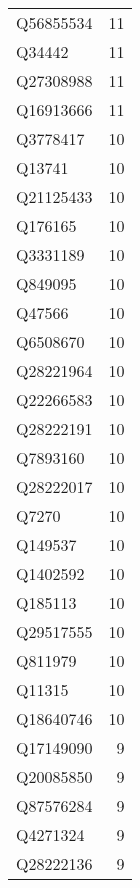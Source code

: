 \begin{tabular}{lr}
   Q56855534 &                            11 \\
      Q34442 &                            11 \\
   Q27308988 &                            11 \\
   Q16913666 &                            11 \\
    Q3778417 &                            10 \\
      Q13741 &                            10 \\
   Q21125433 &                            10 \\
     Q176165 &                            10 \\
    Q3331189 &                            10 \\
     Q849095 &                            10 \\
      Q47566 &                            10 \\
    Q6508670 &                            10 \\
   Q28221964 &                            10 \\
   Q22266583 &                            10 \\
   Q28222191 &                            10 \\
    Q7893160 &                            10 \\
   Q28222017 &                            10 \\
       Q7270 &                            10 \\
     Q149537 &                            10 \\
    Q1402592 &                            10 \\
     Q185113 &                            10 \\
   Q29517555 &                            10 \\
     Q811979 &                            10 \\
      Q11315 &                            10 \\
   Q18640746 &                            10 \\
   Q17149090 &                             9 \\
   Q20085850 &                             9 \\
   Q87576284 &                             9 \\
    Q4271324 &                             9 \\
   Q28222136 &                             9 \\

\end{tabular}
